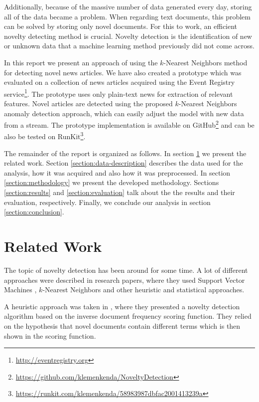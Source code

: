 \documentclass{acm_proc_article-sp}
\begin{document}
Additionally, because of the massive number of data generated every day, storing all of the data became a problem. When regarding text documents, this problem can be solved by storing only novel documents. For this to work, an efficient novelty detecting method is crucial. Novelty detection is the identification of new or unknown data that a machine learning method previously did not come across.

In this report we present an approach of using the $k$-Nearest Neighbors method for detecting novel news articles. We have also created a prototype which was evaluated on a collection of news articles acquired using the Event Registry service\footnote{\url{http://eventregistry.org}}. The prototype uses only plain-text news for extraction of relevant features. Novel articles are detected using the proposed $k$-Nearest Neighbors anomaly detection approach, which can  easily adjust the model with new data from a stream. The prototype implementation is available on GitHub\footnote{\url{https://github.com/klemenkenda/NoveltyDetection}} and can be also be tested on RunKit\footnote{\url{https://runkit.com/klemenkenda/58983987dbfac2001413239a}}. 

The remainder of the report is organized as follows. In section \ref{section:related-work} we present the related work. Section \ref{section:data-description} describes the data used for the analysis, how it was acquired and also how it was preprocessed. In section \ref{section:methodology} we present the developed methodology. Sections \ref{section:results} and \ref{section:evaluation} talk about the the results and their evaluation, respectively. Finally, we conclude our analysis in section \ref{section:conclusion}.


\section{Related Work}\label{section:related-work}
The topic of novelty detection has been around for some time. A lot of different approaches were described in research papers, where they used Support Vector Machines \cite{clifton2014probabilistic, scholkopf1999support}, $k$-Nearest Neighbors \cite{liao2002use} and other heuristic and statistical approaches.

A heuristic approach was taken in \cite{karkali2013efficient}, where they presented a novelty detection algorithm based on the inverse document frequency scoring function. They relied on the hypothesis that novel documents contain different terms which is then shown in the scoring function.
\end{document}
